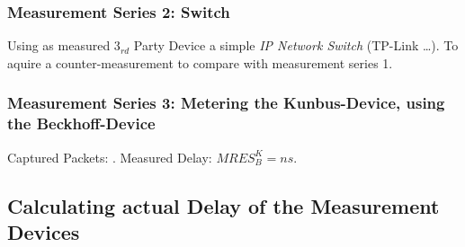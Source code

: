 \subsubsection{Measurement Series 2: Switch}

Using as measured 3$_{rd}$ Party Device a simple \textit{IP Network Switch} (TP-Link \ldots). To aquire a counter-measurement to compare with measurement series 1.




\subsubsection{Measurement Series 3: Metering the Kunbus-Device, using the Beckhoff-Device}

Captured Packets: .\nl%
Measured Delay: $MRES_B^{K}=ns$.




\subsection{Calculating actual Delay of the Measurement Devices}



 



